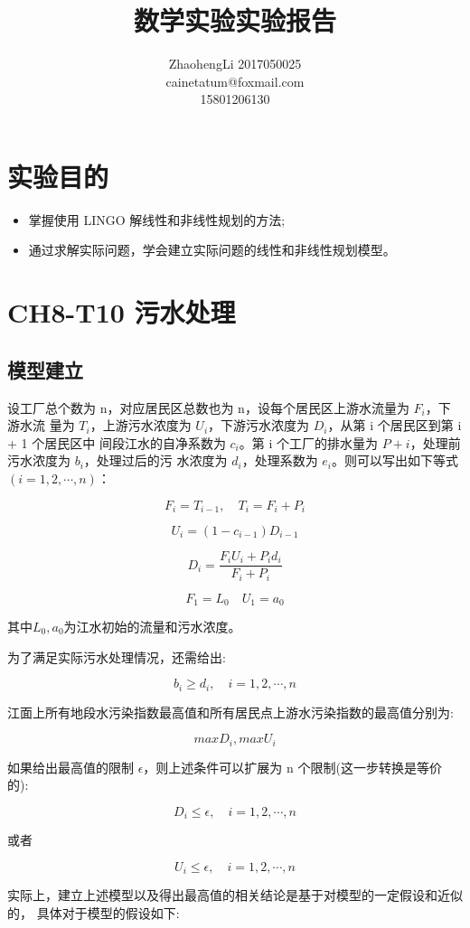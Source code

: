 \documentclass{article}
\title{数学实验实验报告}
\author{ZhaohengLi 2017050025\\cainetatum@foxmail.com\\15801206130}
\begin{document}
\maketitle
\section{实验目的}
\begin{itemize}
	\item{掌握使用 LINGO 解线性和非线性规划的方法;}
	\item{通过求解实际问题，学会建立实际问题的线性和非线性规划模型。}
\end{itemize}


\section{CH8-T10 污水处理}

\subsection{模型建立}
设工厂总个数为 n，对应居民区总数也为 n，设每个居民区上游水流量为 $F_i$，下游水流 量为 $T_i$，上游污水浓度为 $U_i$，下游污水浓度为 $D_i$，从第 i 个居民区到第 i + 1 个居民区中 间段江水的自净系数为 $c_i$。第 i 个工厂的排水量为 $P+i$，处理前污水浓度为 $b_i$，处理过后的污 水浓度为 $d_i$，处理系数为 $e_i$。则可以写出如下等式$(i = 1, 2,\cdots,n)$：

$$F_i=T_{i-1},\quad T_i=F_i+P_i$$

$$U_i=(1-c_{i-1})D_{i-1}$$

$$D_i=\frac{F_iU_i+P_id_i}{F_i+P_i}$$

$$F_1=L_0\quad U_1=a_0$$

其中$L_0,a_0$为江水初始的流量和污水浓度。

为了满足实际污水处理情况，还需给出:

$$b_i\geq d_i,\quad i=1,2,\cdots,n$$

江面上所有地段水污染指数最高值和所有居民点上游水污染指数的最高值分别为:

$$maxD_i, maxU_i$$

如果给出最高值的限制 $\epsilon$，则上述条件可以扩展为 n 个限制(这一步转换是等价的):

$$D_i \leq \epsilon, \quad i=1,2,\cdots,n$$

或者

$$U_i \leq \epsilon, \quad i=1,2,\cdots,n$$


实际上，建立上述模型以及得出最高值的相关结论是基于对模型的一定假设和近似的，
具体对于模型的假设如下:
\end{document}
